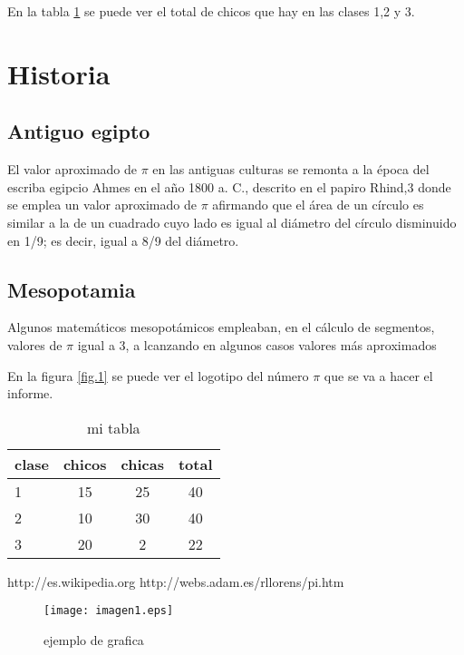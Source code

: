 \documentclass[a4paper,12pt]{article}
\begin{document}
En la tabla \ref{table1} se puede ver el total de chicos que hay en las clases 1,2 y 3.

\section{Historia}
\subsection{Antiguo egipto}
El valor aproximado de $\pi$ en las antiguas culturas se remonta a la época del escriba egipcio Ahmes en el año 1800 a. C., 
descrito en el papiro Rhind,3 donde se emplea un valor aproximado de $\pi$ afirmando que el área de un círculo es similar a 
la de un cuadrado cuyo lado es igual al diámetro del círculo disminuido en 1/9; es decir, igual a 8/9 del diámetro.

\cite{pi}

\subsection{Mesopotamia}
Algunos matemáticos mesopotámicos empleaban, en el cálculo de segmentos, valores de $\pi$ igual a 3, a
lcanzando en algunos casos valores más aproximados

    

En la figura \ref{fig.1} se puede ver el logotipo del número $\pi$ que se va a hacer el informe.

\begin{table}[h]
\begin{center}
 \begin{tabular}{|l|c|c|c|}
 \hline
 
clase & chicos & chicas & total \\ \hline
 1 & 15 & 25 & 40 \\ \hline
 2 & 10 & 30 & 40 \\ \hline
 3 & 20 & 2 & 22 \\ \hline
 
  
\end{tabular}
\caption{mi tabla}
\label{table1}
\end{center}
\end{table}


\begin{thebibliography}{00}
 http://es.wikipedia.org
 http://webs.adam.es/rllorens/pi.htm
\end{thebibliography}

\begin{figure}[t]
 \texttt{[image: imagen1.eps]}
 \caption{ejemplo de grafica}
 \label{fig1}
\end{figure}
\end{document}
